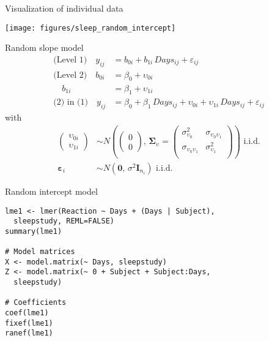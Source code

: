 \documentclass{beamer}
\newcommand{\vect}[1]{\mathbf{#1}}
\newcommand{\mat}[1]{\mathbf{#1}}
\newcommand{\gvect}[1]{\boldsymbol{#1}}
\newcommand{\gmat}[1]{\boldsymbol{#1}}
\begin{document}
\begin{frame}{Visualization of individual data}
  \begin{center}
      \texttt{[image: figures/sleep\_random\_intercept]}
  \end{center}
\end{frame}


\begin{frame}[fragile]{Random slope model}
\begin{align*}
\text{(Level 1)}  \quad y_{ij} &= b_{0i} + b_{1i}\,Days_{ij} + \varepsilon_{ij}\\
\text{(Level 2)}  \quad b_{0i} &= \beta_0 + \upsilon_{0i}\\
                  \quad b_{1i} &= \beta_1 + \upsilon_{1i}\\
\text{(2) in (1)} \quad y_{ij} &= \beta_0 + \beta_1\,Days_{ij} +
                   \upsilon_{0i} + \upsilon_{1i} \, Days_{ij}+ \varepsilon_{ij}
\end{align*}
with
\begin{align*}
  \begin{pmatrix} \upsilon_{0i}\\ \upsilon_{1i} \end{pmatrix} &\sim
    N \left(\begin{pmatrix} 0\\ 0 \end{pmatrix}, \, \gmat{\Sigma}_\upsilon =
      \begin{pmatrix}
        \sigma^2_{\upsilon_0} & \sigma_{\upsilon_0 \upsilon_1} \\
        \sigma_{\upsilon_0 \upsilon_1} & \sigma^2_{\upsilon_1} \\
      \end{pmatrix} \right)
    \text{ i.i.d.} \\
  \gvect{\varepsilon}_i &\sim N(\vect{0}, \, \sigma^2 \mat{I}_{n_i})
    \text{ i.i.d.}
\end{align*}
\end{frame}

{

\begin{frame}[fragile]{Random intercept model}
\begin{lstlisting}
lme1 <- lmer(Reaction ~ Days + (Days | Subject),
  sleepstudy, REML=FALSE)
summary(lme1)

# Model matrices
X <- model.matrix(~ Days, sleepstudy)
Z <- model.matrix(~ 0 + Subject + Subject:Days,
  sleepstudy)

# Coefficients
coef(lme1)
fixef(lme1)
ranef(lme1)
\end{lstlisting}
\end{frame}

}
\end{document}
